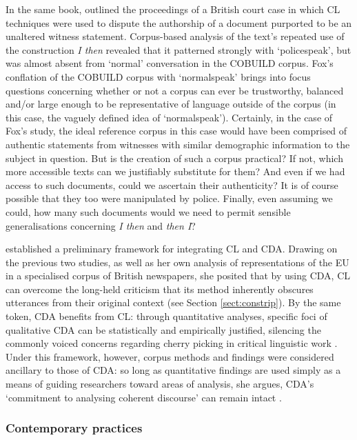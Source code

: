 In the same book, \textcite{fox_comparison_1993} outlined the proceedings of a British court case in which \gls{CL} techniques were used to dispute the authorship of a document purported to be an unaltered witness statement. Corpus-based analysis of the text's repeated use of the construction \emph{I then} revealed that it patterned strongly with `policespeak', but was almost absent from `normal' conversation in the COBUILD \gls{corpus}. Fox's conflation of the COBUILD \gls{corpus} with `normalspeak' brings into focus questions concerning whether or not a \gls{corpus} can ever be trustworthy, balanced and\slash or large enough to be representative of language outside of the \gls{corpus} (in this case, the vaguely defined idea of `normalspeak'). Certainly, in the case of Fox's study, the ideal reference \gls{corpus} in this case would have been comprised of authentic statements from witnesses with similar demographic information to the subject in question. But is the creation of such a \gls{corpus} practical? If not, which more accessible texts can we justifiably substitute for them? And even if we had access to such documents, could we ascertain their authenticity? It is of course possible that they too were manipulated by police. Finally, even assuming we could, how many such documents would we need to permit sensible generalisations concerning \emph{I then} and \emph{then I}?

\textcite{hardt-mautner_only_1995} established a preliminary framework for integrating \gls{CL} and \gls{CDA}. Drawing on the previous two studies, as well as her own analysis of representations of the EU in a specialised \gls{corpus} of British newspapers, she posited that by using \gls{CDA}, \gls{CL} can overcome the long\hyp{}held criticism that its method inherently obscures utterances from their original context (see Section \ref{sect:constrip}). By the same token, \gls{CDA} benefits from \gls{CL}: through quantitative analyses, specific foci of qualitative \gls{CDA} can be statistically and empirically justified, silencing the commonly voiced concerns regarding cherry picking in critical linguistic work \cite{baker_acceptable_2012}.  Under this framework, however, \gls{corpus} methods and findings were considered ancillary to those of \gls{CDA}: so long as quantitative findings are used simply as a means of guiding researchers toward areas of analysis, she argues, \gls{CDA}'s `commitment to analysing coherent discourse' can remain intact \parencite*[p.~3]{hardt-mautner_only_1995}.

\subsubsection{Contemporary practices}

